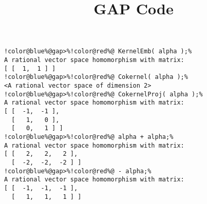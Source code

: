 \documentclass[12pt]{amsart}
\title{GAP Code}
\author{}
\begin{document}
\maketitle

\begin{Verbatim}[commandchars=!@\%,frame=single]
!color@blue%@gap>%!color@red%@ KernelEmb( alpha );%
A rational vector space homomorphism with matrix:
[ [  1,  1 ] ]
!color@blue%@gap>%!color@red%@ Cokernel( alpha );%
<A rational vector space of dimension 2>
!color@blue%@gap>%!color@red%@ CokernelProj( alpha );%
A rational vector space homomorphism with matrix: 
[ [  -1,  -1 ],
  [   1,   0 ],
  [   0,   1 ] ]
!color@blue%@gap>%!color@red%@ alpha + alpha;%
A rational vector space homomorphism with matrix: 
[ [   2,   2,   2 ],
  [  -2,  -2,  -2 ] ]
!color@blue%@gap>%!color@red%@ - alpha;%
A rational vector space homomorphism with matrix: 
[ [  -1,  -1,  -1 ],
  [   1,   1,   1 ] ]
\end{Verbatim}
\end{document}
